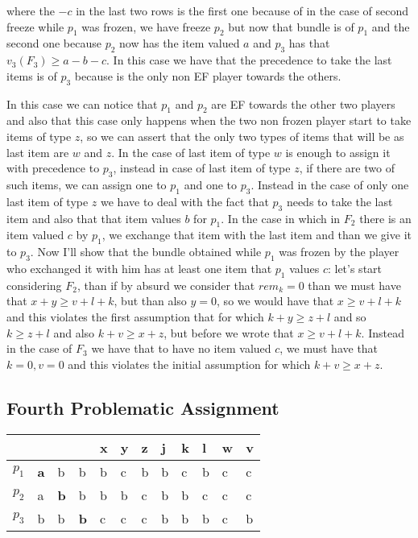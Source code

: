 \documentclass{article}
\begin{document}
where the $-c$ in the last two rows is the first one because of in the case of second freeze while $p_1$ was frozen, we have freeze $p_2$ but now that bundle is of $p_1$ and the second one because $p_2$ now has the item valued $a$ and $p_3$ has that $v_3(F_3) \ge a - b - c$. In this case we have that the precedence to take the last items is of $p_3$ because is the only non EF player towards the others. 

In this case we can notice that $p_1$ and $p_2$ are EF towards the other two players and also that this case only happens when the two non frozen player start to take items of type $z$, so we can assert that the only two types of items that will be as last item are $w$ and $z$. In the case of last item of type $w$ is enough to assign it with precedence to $p_3$, instead in case of last item of type $z$, if there are two of such items, we can assign one to $p_1$ and one to $p_3$. Instead in the case of only one last item of type $z$ we have to deal with the fact that $p_3$ needs to take the last item and also that that item values $b$ for $p_1$. In the case in which in $F_2$ there is an item valued $c$ by $p_1$, we exchange that item with the last item and than we give it to $p_3$. Now I'll show that the bundle obtained while $p_1$ was frozen by the player who exchanged it with him has at least one item that $p_1$ values $c$: let's start considering $F_2$, than if by absurd we consider that $rem_k = 0$ than we must have that $x + y \ge v + l + k$, but than also $y = 0$, so we would have that $x \ge v + l + k$ and this violates the first assumption that for which $k + y \ge z + l$ and so $k \ge z + l$ and also $k + v \ge x + z$, but before we wrote that $x \ge v + l + k$. Instead in the case of $F_3$ we have that to have no item valued $c$, we must have that $k = 0, v = 0$ and this violates the initial assumption for which $k + v \ge x + z$.

\subsection{Fourth Problematic Assignment}
\begin{table}[h]
\centering
\begin{tabular}{|l|l|l|l|l|l|l|l|l|l|l|l|}
\hline
      &                 &               &               & x & y & z & j & k & l & w & v \\ \hline
$p_1$ & \textbf{a}     & b             & b             & b & c & b & b & c & b & c & c \\ \hline
$p_2$ & a               & \textbf{b}    & b             & b & b & c & b & b & c & c & c \\ \hline
$p_3$ & b               & b             & \textbf{b}    & c & c & c & b & b & b & c & b \\ \hline
\end{tabular}
\end{table}
\end{document}
